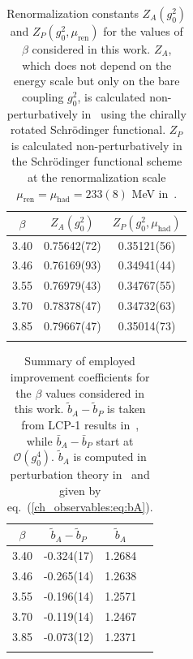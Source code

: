 \begin{longtable}{c c c}
    \label{ch_observables:tab:Z}
    $\beta$ & $Z_A(g_0^2)$ & $Z_P(g_0^2,\mu_{\textrm{had}})$ \\
    \toprule
    3.40 & 0.75642(72) & 0.35121(56) \\
    3.46 & 0.76169(93) & 0.34941(44) \\
    3.55 & 0.76979(43) & 0.34767(55) \\
    3.70 & 0.78378(47) & 0.34732(63) \\
    3.85 & 0.79667(47) & 0.35014(73) \\
    \bottomrule
    \caption{Renormalization constants $Z_A(g_0^2)$ and $Z_P(g_0^2,\mu_{\textrm{ren}})$ for the values of $\beta$ considered in this work. $Z_A$, which does not depend on the energy scale but only on the bare coupling $g_0^2$, is calculated non-perturbatively in~\citep{DallaBrida:2018tpn} using the chirally rotated Schrödinger functional. $Z_P$ is calculated non-perturbatively in the Schrödinger functional scheme at the renormalization scale $\mu_{\textrm{ren}}=\mu_{\textrm{had}}=233(8)$ MeV in~\citep{Campos:2018ahf}.}
\end{longtable}

\begin{longtable}{c c c c}
    \label{ch_observables:tab:b}
    $\beta$ & $\tilde{b}_A-\tilde{b}_P$ & $\tilde{b}_A$ \\
    \toprule
    3.40 & -0.324(17) & 1.2684 \\
    3.46 & -0.265(14) & 1.2638 \\
    3.55 & -0.196(14) & 1.2571 \\
    3.70 & -0.119(14) & 1.2467 \\
    3.85 & -0.073(12) & 1.2371 \\
    \bottomrule
    \caption{Summary of employed improvement coefficients for the $\beta$ values considered in this work. $\tilde{b}_A-\tilde{b}_P$ is taken from LCP-1 results in~\citep{deDivitiis:2017vvw}, while $\bar{b}_A-\bar{b}_P$ start at $\mathcal{O}(g_0^4)$. $\tilde{b}_A$ is computed in perturbation theory in~\citep{Taniguchi:1998pf} and given by eq.~(\ref{ch_observables:eq:bA}).}
\end{longtable}

